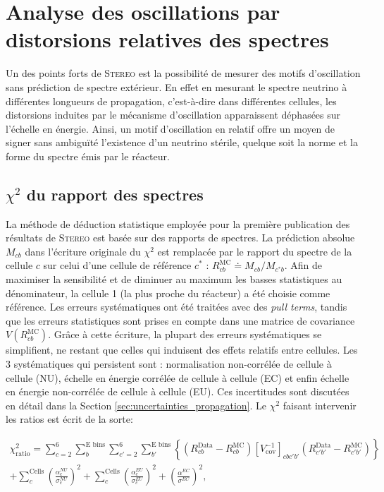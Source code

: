 \section{Analyse des oscillations par distorsions relatives des spectres}
\label{sec:chi2_relat}

Un des points forts de \textsc{Stereo} est la possibilité de mesurer des motifs d'oscillation sans prédiction de spectre extérieur. En effet en mesurant le spectre neutrino à différentes longueurs de propagation, c'est-à-dire dans différentes cellules, les distorsions induites par le mécanisme d'oscillation apparaissent déphasées sur l'échelle en énergie. Ainsi, un motif d'oscillation en relatif offre un moyen de signer sans ambiguïté l'existence d'un neutrino stérile, quelque soit la norme et la forme du spectre émis par le réacteur.\\

\subsection{$\chi^2$ du rapport des spectres}
\label{sec:chi2_ratio_method}

La méthode de déduction statistique employée pour la première publication des résultats de \textsc{Stereo} \cite{Almazan:2018wln} est basée sur des rapports de spectres. La prédiction absolue $M_{cb}$ dans l'écriture originale du $\chi^2$ est remplacée par le rapport du spectre de la cellule $c$ sur celui d'une cellule de référence $c^*$ : $R_{cb}^\textrm{MC} \doteq M_{cb}/M_{c^*b}$. Afin de maximiser la sensibilité et de diminuer au maximum les basses statistiques au dénominateur, la cellule 1 (la plus proche du réacteur) a été choisie comme référence. Les erreurs systématiques ont été traitées avec des \textit{pull terms}, tandis que les erreurs statistiques sont prises en compte dans une matrice de covariance $V\left(R_{cb}^\textrm{MC}\right)$. Grâce à cette écriture, la plupart des erreurs systématiques se simplifient, ne restant que celles qui induisent des effets relatifs entre cellules. Les 3 systématiques qui persistent sont : \og normalisation non-corrélée de cellule à cellule\fg{} (NU), \og échelle en énergie corrélée de cellule à cellule\fg{} (EC) et enfin \og échelle en énergie non-corrélée de cellule à cellule\fg{} (EU). Ces incertitudes sont discutées en détail dans la Section \ref{sec:uncertainties_propagation}. Le $\chi^2$ faisant intervenir les ratios est écrit de la sorte:

\begin{align}
    \chi^2_\textrm{ratio} = \sum_{c = 2}^\textrm{6}\sum_b^\textrm{E bins}\sum_{c' = 2}^\textrm{6}\sum_{b'}^\textrm{E bins} \left\{ \left(R_{cb}^\textrm{Data} - R_{cb}^\textrm{MC}\right) \left[V_\textrm{cov}^{-1}\right]_{cbc'b'} \left(R_{c'b'}^\textrm{Data} - R_{c'b'}^\textrm{MC}\right)\right\} \\
    + \sum_c^\textrm{Cells} \left( \frac{\alpha^{NU}_c}{\sigma^{NU}_c} \right)^2 + \sum_c^\textrm{Cells} \left( \frac{\alpha^{EU}_c}{\sigma^{EU}_c} \right)^2 + \left( \frac{\alpha^{EC}}{\sigma^{EC}} \right)^2,
\end{align}


